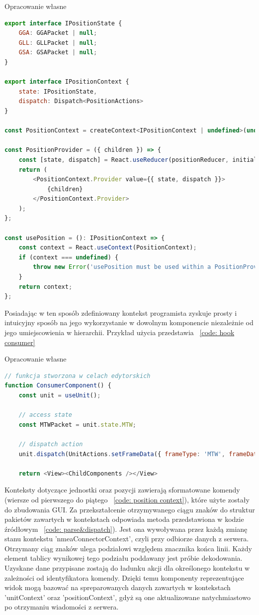 \documentclass[skorowidz,skroty]{dyplomWEZUT}
\begin{document}
{Opracowanie własne}{\label{code: position context}}
\begin{lstlisting}[language=JavaScript]
export interface IPositionState {
    GGA: GGAPacket | null;
    GLL: GLLPacket | null;
    GSA: GSAPacket | null;
}

export interface IPositionContext {
    state: IPositionState,
    dispatch: Dispatch<PositionActions>
}

const PositionContext = createContext<IPositionContext | undefined>(undefined);

const PositionProvider = ({ children }) => {
    const [state, dispatch] = React.useReducer(positionReducer, initialState);
    return (
        <PositionContext.Provider value={{ state, dispatch }}>
            {children}
        </PositionContext.Provider>
    );
};

const usePosition = (): IPositionContext => {
    const context = React.useContext(PositionContext);
    if (context === undefined) {
        throw new Error('usePosition must be used within a PositionProvider');
    }
    return context;
};
\end{lstlisting}

Posiadając w ten sposób zdefiniowany kontekst programista zyskuje prosty i intuicyjny sposób na jego wykorzystanie w dowolnym komponencie niezależnie od jego umiejscowienia w hierarchii. Przykład użycia przedstawia ~\ref{code: hook consumer}

{Opracowanie własne}{\label{code: hook consumer}}
\begin{lstlisting}[language=JavaScript]
// funkcja stworzona w celach edytorskich
function ConsumerComponent() {
    const unit = useUnit();
    
    // access state
    const MTWPacket = unit.state.MTW;
    
    // dispatch action
    unit.dispatch(UnitActions.setFrameData({ frameType: 'MTW', frameData: data })
    
    return <View><ChildComponents /></View>

\end{lstlisting}

Konteksty dotyczące jednostki oraz pozycji zawierają sformatowane komendy (wiersze od pierwszego do piątego ~\ref{code: position context}), które użyte zostały do zbudowania GUI. Za przekształcenie otrzymywanego ciągu znaków do struktur pakietów zawartych w kontekstach odpowiada metoda przedstawiona w kodzie źródłowym ~\ref{code: parse&dispatch}). Jest ona wywoływana przez każdą zmianę stanu kontekstu 'nmeaConnectorContext', czyli przy odbiorze danych z serwera. Otrzymany ciąg znaków ulega podziałowi względem znacznika końca linii. Każdy element tablicy wynikowej tego podziału poddawany jest próbie dekodowania. Uzyskane dane przypisane zostają do ładunku akcji dla określonego kontekstu w zależności od identyfikatora komendy. Dzięki temu komponenty reprezentujące widok mogą bazować na spreparowanych danych zawartych w kontekstach 'unitContext' oraz 'positionContext', gdyż są one aktualizowane natychmiastowo po otrzymaniu wiadomości z serwera.
\end{document}
